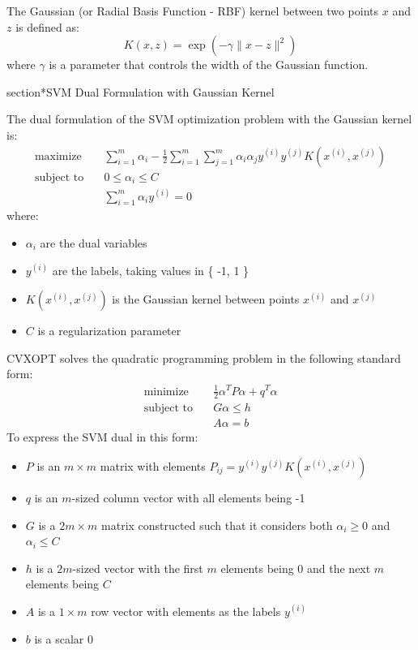 \documentclass[12pt,a4paper]{article}
\begin{document}
The Gaussian (or Radial Basis Function - RBF) kernel between two points \( x \) and \( z \) is defined as:
\[
K(x, z) = \exp(-\gamma \|x - z\|^2)
\]
where \( \gamma \) is a parameter that controls the width of the Gaussian function.

section*{SVM Dual Formulation with Gaussian Kernel}

The dual formulation of the SVM optimization problem with the Gaussian kernel is:
\begin{align*}
\text{maximize} \quad & \sum_{i=1}^{m} \alpha_i - \frac{1}{2} \sum_{i=1}^{m} \sum_{j=1}^{m} \alpha_i \alpha_j y^{(i)} y^{(j)} K(x^{(i)}, x^{(j)}) \\
\text{subject to} \quad & 0 \leq \alpha_i \leq C \\
& \sum_{i=1}^{m} \alpha_i y^{(i)} = 0
\end{align*}
where:
\begin{itemize}
    \item \( \alpha_i \) are the dual variables
    \item \( y^{(i)} \) are the labels, taking values in \{ -1, 1 \}
    \item \( K(x^{(i)}, x^{(j)}) \) is the Gaussian kernel between points \( x^{(i)} \) and \( x^{(j)} \)
    \item \( C \) is a regularization parameter
\end{itemize}

CVXOPT solves the quadratic programming problem in the following standard form:
\begin{align*}
\text{minimize} \quad & \frac{1}{2} \alpha^T P \alpha + q^T \alpha \\
\text{subject to} \quad & G\alpha \leq h \\
& A\alpha = b
\end{align*}
To express the SVM dual in this form:
\begin{itemize}
    \item \( P \) is an \( m \times m \) matrix with elements \( P_{ij} = y^{(i)} y^{(j)} K(x^{(i)}, x^{(j)}) \)
    \item \( q \) is an \( m \)-sized column vector with all elements being -1
    \item \( G \) is a \( 2m \times m \) matrix constructed such that it considers both \( \alpha_i \geq 0 \) and \( \alpha_i \leq C \)
    \item \( h \) is a \( 2m \)-sized vector with the first \( m \) elements being 0 and the next \( m \) elements being \( C \)
    \item \( A \) is a \( 1 \times m \) row vector with elements as the labels \( y^{(i)} \)
    \item \( b \) is a scalar 0
\end{itemize}
\end{document}
